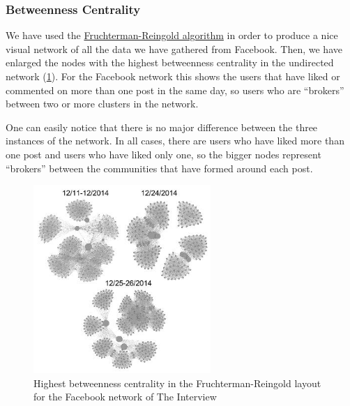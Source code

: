 \documentclass{llncs}
\begin{document}
\subsubsection{Betweenness Centrality}
We have used the
\href{https://github.com/gephi/gephi/wiki/Fruchterman-Reingold}{Fruchterman-Reingold
algorithm} in order to produce a nice visual network of all the data we have
gathered from Facebook. Then, we have enlarged the nodes with the highest
betweenness centrality in the undirected network
(\ref{fig:interview-facebook-betweennes-centrality}). For the Facebook network
this shows the users that have liked or commented on more than one post in the
same day, so users who are “brokers” between two or more clusters in the
network.

One can easily notice that there is no major difference between the three
instances of the network. In all cases, there are users who have liked more than
one post and users who have liked only one, so the bigger nodes represent
“brokers” between the communities that have formed around each post.
%
\begin{figure}
\centering
\includegraphics[width=0.6\textwidth]{interview-facebook-betweennes-centrality.jpg}
\caption{Highest betweenness centrality in the Fruchterman-Reingold layout for
    the Facebook network of The Interview
\label{fig:interview-facebook-betweennes-centrality}}
\end{figure}
%
\end{document}
